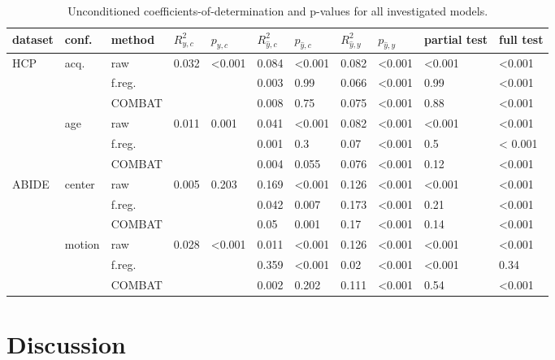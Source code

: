 \documentclass{article}
\begin{document}
\renewcommand{\arraystretch}{1.2}
\begin{table}
\centering
\begin{tabular}{lll|ll|ll|ll|ll} 
dataset & conf. & method & $R^2_{y, c}$ & $p_{y, c}$ & $R^2_{\hat{y}, c}$ & $p_{\hat{y}, c}$ & $R^2_{\hat{y}, y}$ & $p_{\hat{y}, y}$ & partial test & full test  \\
\hline
HCP & acq.  & raw      & 0.032 & <0.001 & 0.084 & <0.001  & 0.082 & <0.001 & <0.001 & <0.001 \\
    &              & f.reg.    & & &0.003 & 0.99 & 0.066  & <0.001  & 0.99 & <0.001 \\
    &              & COMBAT    & & &0.008 & 0.75 & 0.075  & <0.001  & 0.88 & <0.001\\
\hline
    & age   & raw       & 0.011 & 0.001  & 0.041 & <0.001  & 0.082  & <0.001 & <0.001 & <0.001 \\
    &       & f.reg.    & & &0.001 & 0.3 & 0.07  & <0.001  & 0.5 & <    0.001 \\
    &       & COMBAT    & & &0.004 & 0.055 & 0.076 & <0.001 & 0.12 & <0.001 \\
\hline
ABIDE   & center   & raw       & 0.005  & 0.203 &  0.169 & <0.001& 0.126     & <0.001 & <0.001 & <0.001 \\
        &          & f.reg.    &  & &  0.042 & 0.007 & 0.173     & <0.001 & 0.21 & <0.001 \\
        &          & COMBAT    &  & &  0.05 & 0.001 & 0.17     & <0.001 & 0.14 & <0.001 \\
\hline
        & motion   & raw       & 0.028 & <0.001 & 0.011    &  <0.001 & 0.126    & <0.001 & <0.001& <0.001 \\
        &          & f.reg.    & & & 0.359    & <0.001  & 0.02   & <0.001 & <0.001 & 0.34 \\
        &          & COMBAT    & & &  0.002 & 0.202 & 0.111     & <0.001 & 0.54 & <0.001 \\
    

\end{tabular}
\caption{\label{tab:unconditional-pvals} Unconditioned coefficients-of-determination and p-values for all investigated models.}
\end{table}

\section{Discussion}
\end{document}
